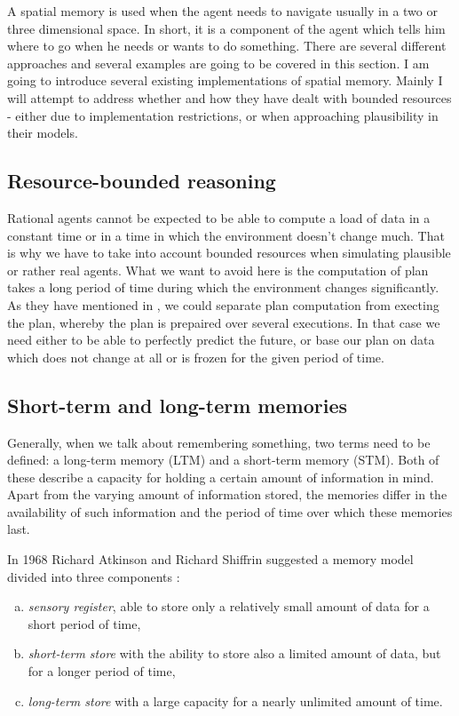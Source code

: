 A spatial memory is used when the agent needs to navigate usually in a two or three dimensional space. In short, it is a component of the agent which tells him where to go when he needs or wants to do something. There are several different approaches and several examples are going to be covered in this section. I am going to introduce several existing implementations of spatial memory. Mainly I will attempt to address whether and how they have dealt with bounded resources - either due to implementation restrictions, or when approaching plausibility in their models.

\subsection{Resource-bounded reasoning}

Rational agents cannot be expected to be able to compute a load of data in a constant time or in a time in which the environment doesn't change much. That is why we have to take into account bounded resources when simulating plausible or rather real agents. What we want to avoid here is the computation of plan takes a long period of time during which the environment changes significantly. As they have mentioned in \cite{Bratman:practicalreasoning}, we could separate plan computation from execting the plan, whereby the plan is prepaired over several executions. In that case we need either to be able to perfectly predict the future, or base our plan on data which does not change at all or is frozen for the given period of time.

\subsection{Short-term and long-term memories}

Generally, when we talk about remembering something, two terms need to be defined: a long-term memory (LTM) and a short-term memory (STM). Both of these describe a capacity for holding a certain amount of information in mind. Apart from the varying amount of information stored, the memories differ in the availability of such information and the period of time over which these memories last.      

In 1968 Richard Atkinson and Richard Shiffrin suggested a memory model divided into three components \cite{Atkinson:humanmemory}: 

\begin{enumerate}[(a)]
\item \emph{sensory register}, able to store only a relatively small amount of data for a short period of time,
\item \emph{short-term store} with the ability to store also a limited amount of data, but for a longer period of time,
\item \emph{long-term store} with a large capacity for a nearly unlimited amount of time.
\end{enumerate}

